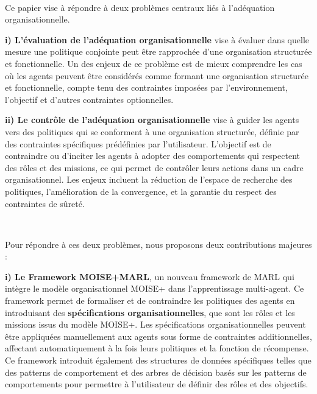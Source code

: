 \documentclass[sigconf,anonymous]{aamas}
\begin{document}
\

\noindent Ce papier vise à répondre à deux problèmes centraux liés à l'adéquation organisationnelle.

\quad \textbf{i) L'évaluation de l'adéquation organisationnelle} vise à évaluer dans quelle mesure une politique conjointe peut être rapprochée d'une organisation structurée et fonctionnelle. Un des enjeux de ce problème est de mieux comprendre les cas où les agents peuvent être considérés comme formant une organisation structurée et fonctionnelle, compte tenu des contraintes imposées par l'environnement, l'objectif et d'autres contraintes optionnelles.

\quad \textbf{ii) Le contrôle de l'adéquation organisationnelle} vise à guider les agents vers des politiques qui se conforment à une organisation structurée, définie par des contraintes spécifiques prédéfinies par l'utilisateur. L'objectif est de contraindre ou d'inciter les agents à adopter des comportements qui respectent des rôles et des missions, ce qui permet de contrôler leurs actions dans un cadre organisationnel. Les enjeux incluent la réduction de l'espace de recherche des politiques, l'amélioration de la convergence, et la garantie du respect des contraintes de sûreté.

\

\noindent Pour répondre à ces deux problèmes, nous proposons deux contributions majeures :

\quad \textbf{i) Le Framework MOISE+MARL}, un nouveau framework de MARL qui intègre le modèle organisationnel MOISE+ dans l'apprentissage multi-agent. Ce framework permet de formaliser et de contraindre les politiques des agents en introduisant des \textbf{spécifications organisationnelles}, que sont les rôles et les missions issus du modèle MOISE+. Les spécifications organisationnelles peuvent être appliquées manuellement aux agents sous forme de contraintes additionnelles, affectant automatiquement à la fois leurs politiques et la fonction de récompense. Ce framework introduit également des structures de données spécifiques telles que des patterns de comportement et des arbres de décision basés sur les patterns de comportements pour permettre à l'utilisateur de définir des rôles et des objectifs.
\end{document}
